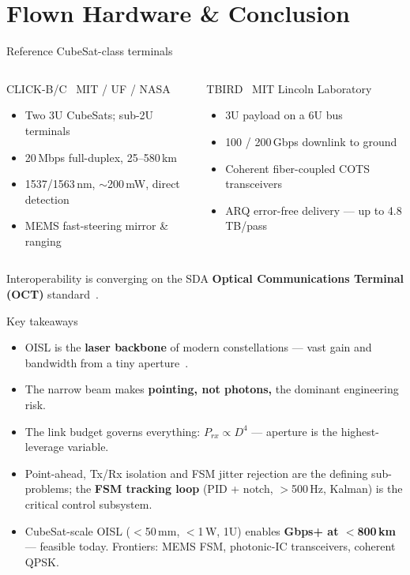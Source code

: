\documentclass{KAIST-slide}
\newcommand{\ai}{\item[\textcolor{islcteal}{\ding{228}}]}      %
\newcommand{\si}{\item[\textcolor{islcorange}{\ding{167}}]}    %
\newcommand{\hi}[1]{\textcolor{islcorange}{\textbf{#1}}}       %
\newcommand{\key}[1]{\textcolor{islcblue}{\textbf{#1}}}        %
\begin{document}
\section{Flown Hardware \& Conclusion}

\begin{frame}{Reference CubeSat-class terminals}
    \begin{columns}[T]
        \begin{block}{CLICK-B/C~\cite{cahoy2020click}}
        \footnotesize MIT / UF / NASA
        \begin{itemize}\scriptsize
            \si Two 3U CubeSats; sub-2U terminals
            \si 20\,Mbps full-duplex, 25--580\,km
            \si 1537/1563\,nm, $\sim$200\,mW, direct detection
            \si MEMS fast-steering mirror \& ranging
        \end{itemize}
        \end{block}
        \begin{block}{TBIRD~\cite{robinson2018tbird,schieler2023tbird}}
        \footnotesize MIT Lincoln Laboratory
        \begin{itemize}\scriptsize
            \si 3U payload on a 6U bus
            \si 100 / 200\,Gbps downlink to ground
            \si Coherent fiber-coupled COTS transceivers
            \si ARQ error-free delivery --- up to 4.8\,TB/pass
        \end{itemize}
        \end{block}
    \end{columns}
    \vspace{2mm}
    \centering\footnotesize Interoperability is converging on the SDA \key{Optical Communications Terminal (OCT)} standard~\cite{sda2022oct}.
\end{frame}

\begin{frame}{Key takeaways}
    \begin{itemize}
        \ai OISL is the \key{laser backbone} of modern constellations --- vast gain and bandwidth from a tiny aperture~\cite{kaushal2017optical,toyoshima2021trends}.
        \ai The narrow beam makes \hi{pointing, not photons,} the dominant engineering risk.
        \ai The link budget governs everything: \key{$P_{rx}\propto D^{4}$} --- aperture is the highest-leverage variable.
        \ai Point-ahead, Tx/Rx isolation and FSM jitter rejection are the defining sub-problems; the \key{FSM tracking loop} (PID + notch, $>$500\,Hz, Kalman) is the critical control subsystem.
        \ai CubeSat-scale OISL ($<$50\,mm, $<$1\,W, 1U) enables \key{Gbps+ at $<$800\,km} --- feasible today. Frontiers: MEMS FSM, photonic-IC transceivers, coherent QPSK.
    \end{itemize}
\end{frame}
\end{document}
